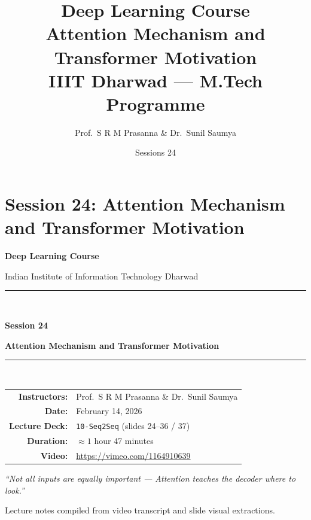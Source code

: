 \documentclass[12pt,a4paper]{article}
\title{%
  {\Large\bfseries Deep Learning Course}\\[6pt]
  {\LARGE Attention Mechanism and Transformer Motivation}\\[4pt]
  {\normalsize IIIT Dharwad --- M.Tech Programme}
}
\author{Prof.\ S R M Prasanna \& Dr.\ Sunil Saumya}
\date{Sessions 24}
\begin{document}
\maketitle
\tableofcontents
\clearpage

\part{Session 24: Attention Mechanism and Transformer Motivation}

\begin{titlepage}
  \centering
  \vspace*{2cm}
  {\LARGE\bfseries Deep Learning Course\par}
  \vspace{0.5cm}
  {\large Indian Institute of Information Technology Dharwad\par}
  \vspace{1.5cm}
  \rule{\linewidth}{0.5mm}\\[0.4cm]
  {\huge\bfseries Session 24\par}
  \vspace{0.3cm}
  {\Large\bfseries Attention Mechanism and Transformer Motivation\par}
  \rule{\linewidth}{0.5mm}\\[1.5cm]

  \begin{tabular}{rl}
    \textbf{Instructors:}  & Prof.\ S R M Prasanna \& Dr.\ Sunil Saumya \\[4pt]
    \textbf{Date:}         & February 14, 2026                           \\[4pt]
    \textbf{Lecture Deck:} & \texttt{10-Seq2Seq} (slides 24--36 / 37)    \\[4pt]
    \textbf{Duration:}     & $\approx 1$ hour 47 minutes                 \\[4pt]
    \textbf{Video:}        & \url{https://vimeo.com/1164910639}          \\
  \end{tabular}

  \vfill
  {\large\itshape
    ``Not all inputs are equally important ---
    Attention teaches the decoder where to look.''\par}
  \vspace{1cm}
  {\normalsize Lecture notes compiled from video transcript and slide
    visual extractions.\par}
\end{titlepage}
\end{document}
